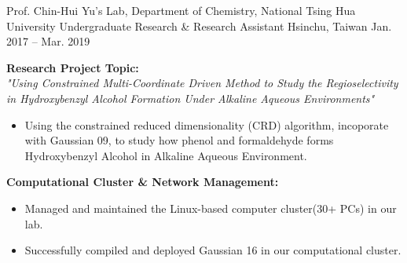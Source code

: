 \begin{cventries}
\cventry
{Prof. Chin-Hui Yu's Lab, Department of Chemistry, National Tsing Hua University} %
{Undergraduate Research \& Research Assistant}
{Hsinchu, Taiwan} %
{Jan. 2017 -- Mar. 2019}
{
\begin{minipage}{\textwidth}
\textbf{Research Project Topic:}\\
\textit{"Using Constrained Multi-Coordinate Driven Method to Study the Regioselectivity in Hydroxybenzyl Alcohol Formation Under Alkaline Aqueous Environments"}
\begin{itemize}
    \item Using the constrained reduced dimensionality (CRD) algorithm, incoporate with Gaussian 09, to study how phenol and formaldehyde forms Hydroxybenzyl Alcohol in Alkaline Aqueous Environment. 
\end{itemize}
\textbf{Computational Cluster \& Network Management:}
\begin{itemize}
    \item Managed and maintained the Linux-based computer cluster(30+ PCs) in our lab.
    \item Successfully compiled and deployed Gaussian 16 in our computational cluster.
\end{itemize}
\end{minipage}
}



\end{cventries}

